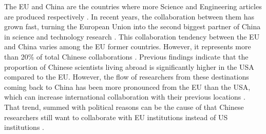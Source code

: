 The EU and China are the countries where more Science and Engineering articles are produced respectively \citep{burke2022state}. In recent years, the collaboration between them has grown fast, turning the European Union into the second biggest partner of China in science and technology research \citep{li2014beyond}. This collaboration tendency between the EU and China varies among the EU former countries. However, it represents more than 20\% of total Chinese collaborations \citep{wang2017network,yuan2018international}. Previous findings indicate that the proportion of Chinese scientists living abroad is significantly higher in the USA compared to the EU. However, the flow of researchers from these destinations coming back to China has been more pronounced from the EU than the USA, which can increase international collaboration with their previous locations \citep{cao2020returning}. That trend, summed with political reasons can be the cause of that Chinese researchers still want to collaborate with EU institutions instead of US institutions \citep{schuller2020united,silver2020us,wagner2022drop}.
